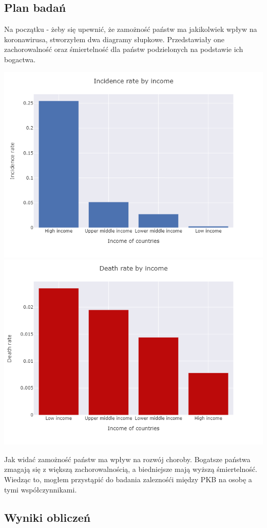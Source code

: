 \documentclass[10pt]{article}
\begin{document}
\subsection{Plan badań}
Na początku - żeby się upewnić, że zamożność państw ma jakikolwiek wpływ na koronawirusa, stworzyłem dwa diagramy słupkowe. Przedstawiały one zachorowalność oraz śmiertelność dla państw podzielonych na podstawie ich bogactwa. 

\begin{center}
\includegraphics[width=0.8\linewidth]{incidence_rate_income.png}
\includegraphics[width=0.8\linewidth]{death_rate_income.png}
\end{center}
Jak widać zamożność państw ma wpływ na rozwój choroby. Bogatsze państwa zmagają się z większą zachorowalnością, a biedniejsze mają wyższą śmiertelność. Wiedząc to, mogłem przystąpić do badania zaleznośći między PKB na osobę a tymi współczynnikami.

\subsection{Wyniki obliczeń}
\end{document}
